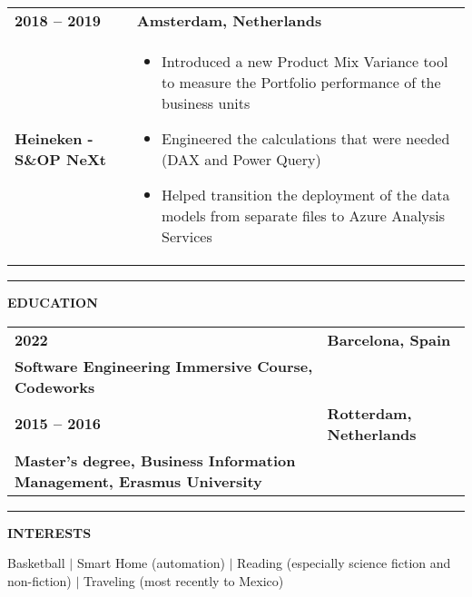 \documentclass[11pt,a4paper]{article}
\begin{document}
\begin{longtable}{p{}p{}}
\textbf{2018 – 2019} & \textbf{Amsterdam, Netherlands} \\
\textbf{Heineken - S\&OP NeXt} & 
\begin{itemize}[leftmargin=0.5cm,itemsep=0pt,parsep=0pt]
\item Introduced a new Product Mix Variance tool to measure the Portfolio performance of the business units
\item Engineered the calculations that were needed (DAX and Power Query)
\item Helped transition the deployment of the data models from separate files to Azure Analysis Services
\end{itemize} \\
\end{longtable}

\vspace{0.5cm}
\rule{\textwidth}{0.5pt}
\vspace{0.5cm}

\begin{center}
\textbf{EDUCATION}
\end{center}

\vspace{0.3cm}

\begin{longtable}{p{}p{}}
\textbf{2022} & \textbf{Barcelona, Spain} \\
\textbf{Software Engineering Immersive Course, Codeworks} & \\

\textbf{2015 – 2016} & \textbf{Rotterdam, Netherlands} \\
\textbf{Master's degree, Business Information Management, Erasmus University} & \\
\end{longtable}

\vspace{0.5cm}
\rule{\textwidth}{0.5pt}
\vspace{0.5cm}

\begin{center}
\textbf{INTERESTS}
\end{center}

\vspace{0.3cm}

\begin{center}
Basketball $|$ Smart Home (automation) $|$ Reading (especially science fiction and non-fiction) $|$ Traveling (most recently to Mexico)
\end{center}
\end{document}
